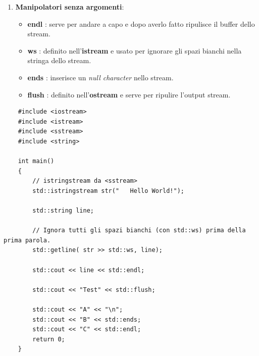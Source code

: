 \begin{enumerate}
	\item \textsf{\small \textbf{Manipolatori senza argomenti}: }
	\begin{itemize}
		\item \textsf{\small \textbf{endl} : serve per andare a capo e dopo averlo fatto ripulisce il buffer dello stream.}
		\item \textsf{\small \textbf{ws} : definito nell'\textbf{istream} e usato per ignorare gli spazi bianchi nella stringa dello stream.}
		\item \textsf{\small \textbf{ends} : inserisce un \emph{null character} nello stream.}
		\item \textsf{\small \textbf{flush} : definito nell'\textbf{ostream} e serve per ripulire l'output stream.}
	\end{itemize}
\end{enumerate}

\begin{lstlisting}
	#include <iostream>
	#include <istream>
	#include <sstream>
	#include <string>
	
	int main()
	{
		// istringstream da <sstream>
		std::istringstream str("   Hello World!");
		
		std::string line;
		
		// Ignora tutti gli spazi bianchi (con std::ws) prima della prima parola.
		std::getline( str >> std::ws, line);
		
		std::cout << line << std::endl;
		
		std::cout << "Test" << std::flush;
		
		std::cout << "A" << "\n";
		std::cout << "B" << std::ends;
		std::cout << "C" << std::endl;
		return 0;
	}
\end{lstlisting}

